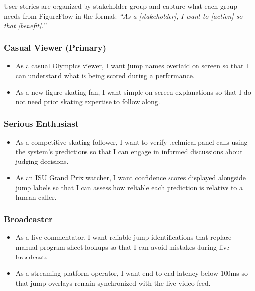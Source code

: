 User stories are organized by stakeholder group and capture what each
group needs from FigureFlow in the format: \textit{``As a [stakeholder],
I want to [action] so that [benefit].''}

\subsubsection*{Casual Viewer (Primary)}

\begin{itemize}
    \item As a casual Olympics viewer, I want jump names overlaid on
    screen so that I can understand what is being scored during a
    performance.

    \item As a new figure skating fan, I want simple on-screen
    explanations so that I do not need prior skating expertise to
    follow along.
\end{itemize}

\subsubsection*{Serious Enthusiast}

\begin{itemize}
    \item As a competitive skating follower, I want to verify technical
    panel calls using the system's predictions so that I can engage
    in informed discussions about judging decisions.

    \item As an ISU Grand Prix watcher, I want confidence scores
    displayed alongside jump labels so that I can assess how reliable
    each prediction is relative to a human caller.
\end{itemize}

\subsubsection*{Broadcaster}

\begin{itemize}
    \item As a live commentator, I want reliable jump identifications
    that replace manual program sheet lookups so that I can avoid
    mistakes during live broadcasts.

    \item As a streaming platform operator, I want end-to-end latency
    below 100ms so that jump overlays remain synchronized with the
    live video feed.
\end{itemize}


